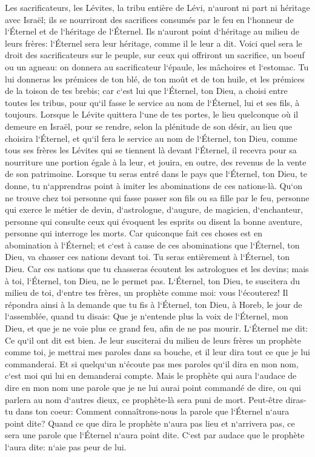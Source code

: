 \verse Les sacrificateurs, les Lévites, la tribu entière de Lévi, n`auront ni part ni héritage avec Israël; ils se nourriront des sacrifices consumés par le feu en l`honneur de l`Éternel et de l`héritage de l`Éternel. 
\verse Ils n`auront point d`héritage au milieu de leurs frères: l`Éternel sera leur héritage, comme il le leur a dit. 
\verse Voici quel sera le droit des sacrificateurs sur le peuple, sur ceux qui offriront un sacrifice, un boeuf ou un agneau: on donnera au sacrificateur l`épaule, les mâchoires et l`estomac. 
\verse Tu lui donneras les prémices de ton blé, de ton moût et de ton huile, et les prémices de la toison de tes brebis; 
\verse car c`est lui que l`Éternel, ton Dieu, a choisi entre toutes les tribus, pour qu`il fasse le service au nom de l`Éternel, lui et ses fils, à toujours. 
\verse Lorsque le Lévite quittera l`une de tes portes, le lieu quelconque où il demeure en Israël, pour se rendre, selon la plénitude de son désir, au lieu que choisira l`Éternel, 
\verse et qu`il fera le service au nom de l`Éternel, ton Dieu, comme tous ses frères les Lévites qui se tiennent là devant l`Éternel, 
\verse il recevra pour sa nourriture une portion égale à la leur, et jouira, en outre, des revenus de la vente de son patrimoine. 
\verse Lorsque tu seras entré dans le pays que l`Éternel, ton Dieu, te donne, tu n`apprendras point à imiter les abominations de ces nations-là. 
\verse Qu`on ne trouve chez toi personne qui fasse passer son fils ou sa fille par le feu, personne qui exerce le métier de devin, d`astrologue, d`augure, de magicien, 
\verse d`enchanteur, personne qui consulte ceux qui évoquent les esprits ou disent la bonne aventure, personne qui interroge les morts. 
\verse Car quiconque fait ces choses est en abomination à l`Éternel; et c`est à cause de ces abominations que l`Éternel, ton Dieu, va chasser ces nations devant toi. 
\verse Tu seras entièrement à l`Éternel, ton Dieu. 
\verse Car ces nations que tu chasseras écoutent les astrologues et les devins; mais à toi, l`Éternel, ton Dieu, ne le permet pas. 
\verse L`Éternel, ton Dieu, te suscitera du milieu de toi, d`entre tes frères, un prophète comme moi: vous l`écouterez! 
\verse Il répondra ainsi à la demande que tu fis à l`Éternel, ton Dieu, à Horeb, le jour de l`assemblée, quand tu disais: Que je n`entende plus la voix de l`Éternel, mon Dieu, et que je ne voie plus ce grand feu, afin de ne pas mourir. 
\verse L`Éternel me dit: Ce qu`il ont dit est bien. 
\verse Je leur susciterai du milieu de leurs frères un prophète comme toi, je mettrai mes paroles dans sa bouche, et il leur dira tout ce que je lui commanderai. 
\verse Et si quelqu`un n`écoute pas mes paroles qu`il dira en mon nom, c`est moi qui lui en demanderai compte. 
\verse Mais le prophète qui aura l`audace de dire en mon nom une parole que je ne lui aurai point commandé de dire, ou qui parlera au nom d`autres dieux, ce prophète-là sera puni de mort. 
\verse Peut-être diras-tu dans ton coeur: Comment connaîtrons-nous la parole que l`Éternel n`aura point dite? 
\verse Quand ce que dira le prophète n`aura pas lieu et n`arrivera pas, ce sera une parole que l`Éternel n`aura point dite. C`est par audace que le prophète l`aura dite: n`aie pas peur de lui. 


